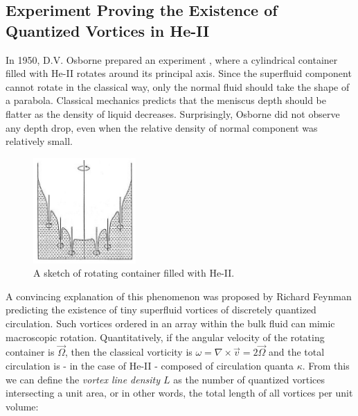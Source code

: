 \newpage




\subsection*{Experiment Proving the Existence of Quantized Vortices in He-II}

In 1950, D.V. Osborne prepared an experiment \cite{osborne}, where a cylindrical container filled with He-II rotates around its principal axis. Since the superfluid component cannot rotate in the classical way, only the normal fluid should take the shape of a parabola. Classical mechanics predicts that the meniscus depth should be flatter as the density of liquid decreases. Surprisingly, Osborne did not observe any depth drop, even when the relative density of normal component was relatively small.

\begin{figure}
\vspace{-0.7cm}
\centering
\includegraphics[width=0.35\textwidth]{graphics/rot_cont}
\vspace{-0.5cm}
\caption{A sketch of rotating container filled with He-II.}
\vspace{-0.5cm}
\end{figure}

A convincing explanation of this phenomenon was proposed by Richard Feynman\cite{feynman} predicting the existence of tiny superfluid vortices of discretely quantized circulation.
Such vortices ordered in an array within the bulk fluid can mimic macroscopic rotation. Quantitatively, if the angular velocity of the rotating container is $\vec{\Omega}$, then the classical vorticity is $ \omega = \nabla \times \vec{v} = 2\vec{\Omega} $ and the total circulation is - in the case of He-II - composed of circulation quanta $ \kappa $. From this we can define the \textit{vortex line density $ L $} as the number of quantized vortices intersecting a unit area, or in other words, the total length of all vortices per unit volume:

